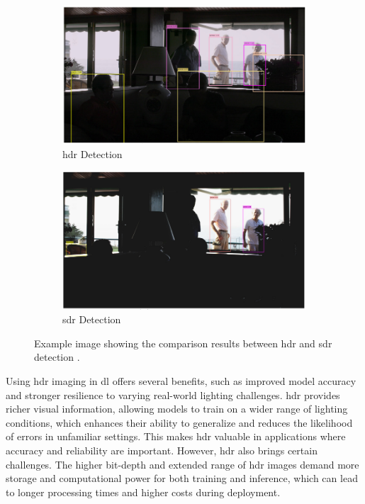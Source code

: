 \begin{figure}[ht]
    \centering
    \begin{subfigure}[b]{0.45\textwidth}
        \centering
        \includegraphics[width=\textwidth]{Figures/HDR.PNG}
        \caption{\gls{hdr} Detection}
        \label{HDR}
    \end{subfigure}
    \hfill
    \begin{subfigure}[b]{0.45\textwidth}
        \centering
        \includegraphics[width=\textwidth]{Figures/SDR.PNG}
        \caption{\gls{sdr} Detection}
        \label{SDR}
    \end{subfigure}
    
    \caption{Example image showing the comparison results between \gls{hdr} and \gls{sdr} detection \cite{HDR}.}
    \label{fig:HDR vs SDR}
\end{figure}

Using \gls{hdr} imaging in \gls{dl} offers several benefits, such as improved model accuracy and stronger resilience to varying real-world lighting challenges. \gls{hdr} provides richer visual information, allowing models to train on a wider range of lighting conditions, which enhances their ability to generalize and reduces the likelihood of errors in unfamiliar settings. This makes \gls{hdr} valuable in applications where accuracy and reliability are important. However, \gls{hdr} also brings certain challenges. The higher bit-depth and extended range of \gls{hdr} images demand more storage and computational power for both training and inference, which can lead to longer processing times and higher costs during deployment.

